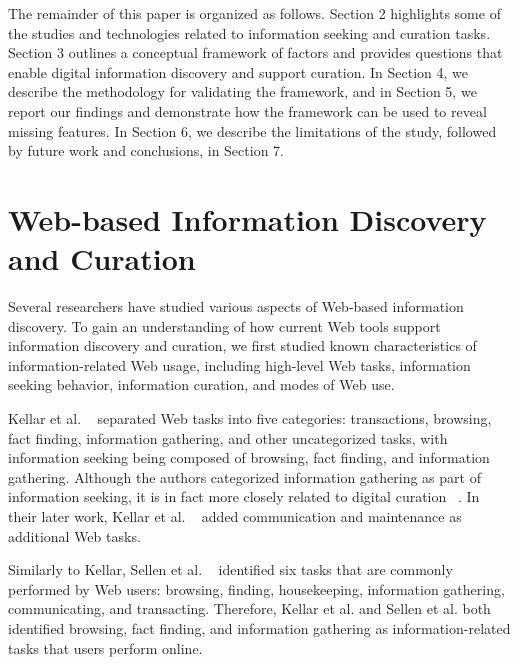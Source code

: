 \documentclass{casconpaper}
\begin{document}
{The remainder of this paper is organized as follows. Section 2 highlights some of the studies and technologies related to information seeking and curation tasks. Section 3 outlines a conceptual framework of factors and provides questions that enable digital information discovery and support curation. In Section 4, we describe the methodology for validating the framework, and in Section 5, we report our findings and demonstrate how the framework can be used to reveal missing features. In Section 6, we describe the limitations of the study, followed by future work and conclusions, in Section 7.

} %


{\section{Web-based Information Discovery and Curation}

Several researchers have studied various aspects of Web-based information discovery. To gain an understanding of how current Web tools support information discovery and curation, we first studied known characteristics of information-related Web usage, including high-level Web tasks, information seeking behavior, information curation, and modes of Web use. 

Kellar et al. ~\cite{kellar2006} separated Web tasks into five categories: transactions, browsing, fact finding, information gathering, and other uncategorized tasks, with information seeking being composed of browsing, fact finding, and information gathering. Although the authors categorized information gathering as part of information seeking, it is in fact more closely related to digital curation ~\cite{beagrie, wittaker}. In their later work, Kellar et al. ~\cite{kellar2007} added communication and maintenance as additional Web tasks. 

Similarly to Kellar, Sellen et al. ~\cite{sellen} identified six tasks that are commonly performed by Web users: browsing, finding, housekeeping, information gathering, communicating, and transacting. Therefore, Kellar et al. and Sellen et al. both identified browsing, fact finding, and information gathering as information-related tasks that users perform online.   

}
\end{document}
